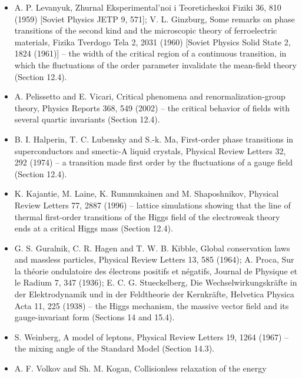 \documentclass[
  10pt,
]{article}
\providecommand{\tightlist}{%
  \setlength{\itemsep}{0pt}\setlength{\parskip}{0pt}}
\begin{document}
\begin{itemize}
  \begin{enumerate}
  \def\labelenumi{(\arabic{enumi})}
  \setcounter{enumi}{1992}
  \tightlist
  \item
    -- the free energy at finite temperature of the three methods
    (Section 12.4).
  \end{enumerate}
\item
  A. P. Levanyuk, Zhurnal Eksperimental'noi i Teoreticheskoi Fiziki 36,
  810 (1959) {[}Soviet Physics JETP 9, 571{]}; V. L. Ginzburg, Some
  remarks on phase transitions of the second kind and the microscopic
  theory of ferroelectric materials, Fizika Tverdogo Tela 2, 2031 (1960)
  {[}Soviet Physics Solid State 2, 1824 (1961){]} -- the width of the
  critical region of a continuous transition, in which the fluctuations
  of the order parameter invalidate the mean-field theory (Section
  12.4).
\item
  A. Pelissetto and E. Vicari, Critical phenomena and
  renormalization-group theory, Physics Reports 368, 549 (2002) -- the
  critical behavior of fields with several quartic invariants (Section
  12.4).
\item
  B. I. Halperin, T. C. Lubensky and S.-k. Ma, First-order phase
  transitions in superconductors and smectic-A liquid crystals, Physical
  Review Letters 32, 292 (1974) -- a transition made first order by the
  fluctuations of a gauge field (Section 12.4).
\item
  K. Kajantie, M. Laine, K. Rummukainen and M. Shaposhnikov, Physical
  Review Letters 77, 2887 (1996) -- lattice simulations showing that the
  line of thermal first-order transitions of the Higgs field of the
  electroweak theory ends at a critical Higgs mass (Section 12.4).
\item
  G. S. Guralnik, C. R. Hagen and T. W. B. Kibble, Global conservation
  laws and massless particles, Physical Review Letters 13, 585 (1964);
  A. Proca, Sur la théorie ondulatoire des électrons positifs et
  négatifs, Journal de Physique et le Radium 7, 347 (1936); E. C. G.
  Stueckelberg, Die Wechselwirkungskräfte in der Elektrodynamik und in
  der Feldtheorie der Kernkräfte, Helvetica Physica Acta 11, 225 (1938)
  -- the Higgs mechanism, the massive vector field and its
  gauge-invariant form (Sections 14 and 15.4).
\item
  S. Weinberg, A model of leptons, Physical Review Letters 19, 1264
  (1967) -- the mixing angle of the Standard Model (Section 14.3).
\item
  A. F. Volkov and Sh. M. Kogan, Collisionless relaxation of the energy

\end{itemize}
\end{document}
